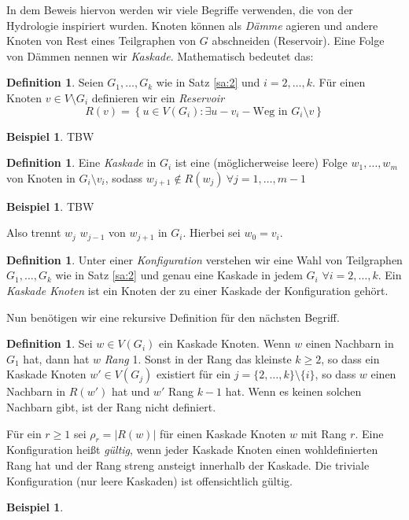 \documentclass[12pt,a4paper]{scrartcl}
\numberwithin{equation}{section} %
\theoremstyle{definition}
\newtheorem{defn}[auf]{Definition}
\newtheorem{bsp}[auf]{Beispiel}
\theoremstyle{plain}
\newcommand{\abs}[1]{\left\vert #1\right\vert}
\begin{document}
In dem Beweis hiervon werden wir viele Begriffe verwenden, die von der Hydrologie inspiriert wurden. Knoten können als \emph{Dämme} agieren und andere Knoten von Rest eines Teilgraphen von $G$ abschneiden (Reservoir). Eine Folge von Dämmen nennen wir \emph{Kaskade}. Mathematisch bedeutet das:
\begin{defn}
Seien $G_1,\dotsc, G_k$ wie in Satz \ref{sa:2} und $i=2,\dotsc,k$. Für einen Knoten $v\in V\setminus G_i$ definieren wir ein \emph{Reservoir} 
\[R(v)=\left\lbrace u\in V(G_i)\colon \exists u-v_i-\text{Weg in }G_i\setminus v\right\rbrace\] 
\end{defn}
\begin{bsp}
TBW
\end{bsp}
\begin{defn}
Eine \emph{Kaskade} in $G_i$ ist eine (möglicherweise leere) Folge $w_1,\dotsc,w_m$ von Knoten in $G_i\setminus v_i$, sodass $w_{j+1}\not\in R(w_j)~\forall j=1,\dotsc,m-1$ 
\end{defn}
\begin{bsp}
TBW
\end{bsp}
Also trennt $w_j$ $w_{j-1}$ von $w_{j+1}$ in $G_i$. Hierbei sei $w_0=v_i$. 
\begin{defn}
Unter einer \emph{Konfiguration} verstehen wir eine Wahl von Teilgraphen $G_1,\dotsc,G_k$ wie in Satz \ref{sa:2} und genau eine Kaskade in jedem $G_i$ $\forall i=2,\dotsc,k$. Ein \emph{Kaskade Knoten} ist ein Knoten der zu einer Kaskade der Konfiguration gehört.
\end{defn}
Nun benötigen wir eine rekursive Definition für den nächsten Begriff.
\begin{defn}
Sei $w\in V(G_i)$ ein Kaskade Knoten. Wenn $w$ einen Nachbarn in $G_1$ hat, dann hat $w$ \emph{Rang} 1. Sonst in der Rang das kleinste $k\ge 2$, so dass ein Kaskade Knoten $w'\in V(G_j)$ existiert für ein $j=\lbrace 2,\dotsc,k\rbrace\setminus \lbrace i\rbrace$, so dass $w$ einen Nachbarn in $R(w')$ hat und $w'$ Rang $k-1$ hat. Wenn es keinen solchen Nachbarn gibt, ist der Rang nicht definiert. \par
Für ein $r\ge 1$ sei $\rho_r=\abs{R(w)}$ für einen Kaskade Knoten $w$ mit Rang $r$. Eine Konfiguration heißt \emph{gültig}, wenn jeder Kaskade Knoten einen wohldefinierten Rang hat und der Rang streng ansteigt innerhalb der Kaskade. Die triviale Konfiguration (nur leere Kaskaden) ist offensichtlich gültig.
\end{defn}
\begin{bsp}
\end{bsp}
\end{document}

